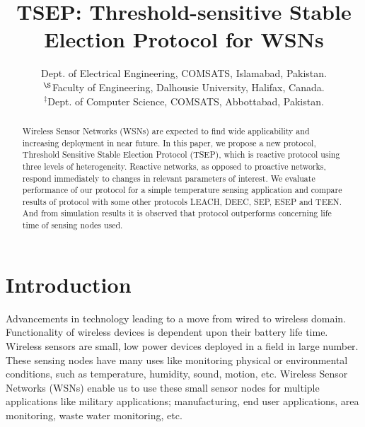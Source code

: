 \documentclass[conference]{IEEEtran}
\begin{document}
\title{TSEP: Threshold-sensitive Stable\\ Election Protocol for WSNs}


\author{
        Dept. of Electrical Engineering, COMSATS, Islamabad, Pakistan. \\
        $^{\S}$Faculty of Engineering, Dalhousie University, Halifax, Canada.\\
        $^{\ddag}$Dept. of Computer Science, COMSATS, Abbottabad, Pakistan.

        }

\maketitle
\begin{abstract}

Wireless Sensor Networks (WSNs) are expected to find wide applicability and increasing deployment in near future. In this paper, we propose a new protocol, Threshold Sensitive Stable Election Protocol (TSEP), which is reactive protocol using three levels of heterogeneity. Reactive networks, as opposed to proactive networks, respond immediately to changes in relevant parameters of interest. We evaluate performance of our protocol for a simple temperature sensing application and compare results of protocol with some other protocols LEACH, DEEC, SEP, ESEP and TEEN. And from simulation results it is observed that protocol outperforms concerning life time of sensing nodes used.
\end{abstract}

\section{Introduction}
Advancements in technology leading to a move from wired to wireless domain. Functionality of wireless devices is dependent upon their battery life time. Wireless sensors are small, low power devices deployed in a field in large number. These sensing nodes have many uses like monitoring physical or environmental conditions, such as temperature, humidity, sound, motion, etc. Wireless Sensor Networks (WSNs) enable us to use these small sensor nodes for multiple applications like military applications; manufacturing, end user applications, area monitoring, waste water monitoring, etc.
\end{document}
